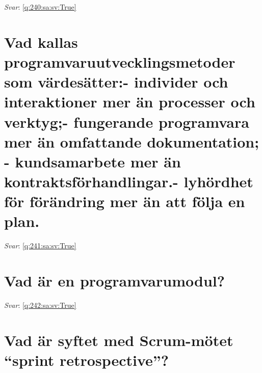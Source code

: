 \documentclass[a4paper,11pt,oneside]{book}
\begin{document}
\begin{sloppypar}
\label{q:240:sa:sv:False}

\vspace{2cm}

\noindent\makebox[\textwidth]{\hrulefill}

\vspace{1cm}

\textit{Svar}: \autoref{q:240:sa:sv:True}



\section{Vad kallas programvaruutvecklingsmetoder som v\"ardes\"atter:- individer och interaktioner mer \"an processer och verktyg;- fungerande programvara mer \"an omfattande dokumentation; - kundsamarbete mer \"an kontraktsf\"orhandlingar.- lyh\"ordhet f\"or f\"or\"andring mer \"an att f\"olja en plan.}

\label{q:241:sa:sv:False}

\vspace{2cm}

\noindent\makebox[\textwidth]{\hrulefill}

\vspace{1cm}

\textit{Svar}: \autoref{q:241:sa:sv:True}



\section{Vad \"ar en programvarumodul?}

\label{q:242:sa:sv:False}

\vspace{2cm}

\noindent\makebox[\textwidth]{\hrulefill}

\vspace{1cm}

\textit{Svar}: \autoref{q:242:sa:sv:True}



\section{Vad \"ar syftet med Scrum-m\"otet {\textquotedblleft}sprint retrospective{\textquotedblright}?}

\label{q:243:sa:sv:False}

\vspace{2cm}


\end{sloppypar}
\end{document}
